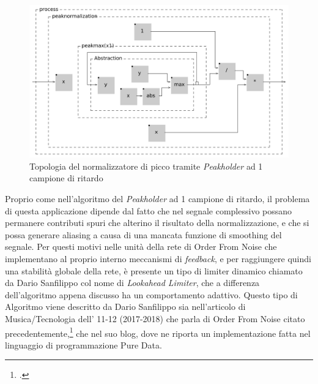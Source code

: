 \clearpage

\begin{figure}[h!]
\begin{center}
    \includegraphics[width=14cm]{figures/PeakNormalizationIIR.pdf}
    \caption {Topologia del normalizzatore di picco tramite \textit{Peakholder} ad 1 campione di ritardo}
\end{center}
\vspace{0.5cm}
\end{figure}
    
Proprio come nell'algoritmo del \textit{Peakholder} ad 1 campione di ritardo, 
il problema di questa applicazione dipende dal fatto che nel segnale
complessivo possano permanere contributi spuri che alterino il risultato
della normalizzazione, e che si possa generare aliasing a causa di una mancata
funzione di smoothing del segnale.
Per questi motivi nelle unità della rete di Order From Noise 
che implementano al proprio interno meccanismi di \emph{feedback},
e per raggiungere quindi una stabilità globale della rete,
è presente un tipo di limiter dinamico chiamato da Dario Sanfilippo
col nome di \textit{Lookahead Limiter}, che a differenza dell'algoritmo
appena discusso ha un comportamento adattivo.
Questo tipo di Algoritmo viene descritto da Dario Sanfilippo sia nell'articolo 
di Musica/Tecnologia dell' 11-12 (2017-2018) che parla di Order From Noise 
citato precedentemente,\footcite{sanfilippo_time-variant_2018}
che nel suo blog, dove ne riporta un implementazione fatta nel linguaggio di programmazione
Pure Data.

